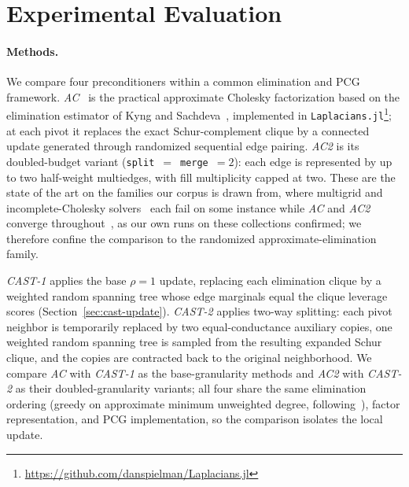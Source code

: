 \documentclass{article}
\newcommand{\CASTone}{\textit{CAST-1}\xspace}
\newcommand{\CASTtwo}{\textit{CAST-2}\xspace}
\newcommand{\AC}{\textit{AC}\xspace}
\newcommand{\ACtwo}{\textit{AC2}\xspace}
\newcommand{\1}{\mathbbm{1}}
\theoremstyle{plain}
\begin{document}

\section{Experimental Evaluation}
\label{sec:empirical_methods}


\paragraph{Methods.}
We compare four pre\-conditioners within a common elimination and PCG
framework. \AC~\cite{AC} is the practical approximate Cholesky
factorization based on the elimination estimator of Kyng and
Sachdeva~\cite{kyng2016approximate}, implemented in
\texttt{Laplacians.jl}\footnote{\url{https://github.com/danspielman/Laplacians.jl}};
at each pivot it replaces the exact Schur-complement clique by a
connected update generated through randomized sequential edge pairing.
\ACtwo{} is its doubled-budget variant (\texttt{split}~$=$~\texttt{merge}~$=2$):
each edge is represented by up to two half-weight multiedges, with fill
multiplicity capped at two. These are the state of the art on the
families our corpus is drawn from, where multigrid and
incomplete-Cholesky solvers~\cite{cmg,hypre,petsc,livne2012lean,icc}
each fail on some instance while \AC{} and \ACtwo{} converge
throughout~\cite{AC}, as our own runs on these collections confirmed; we therefore confine
the comparison to the randomized approximate-elimination family.

\CASTone{} applies the base $\rho=1$ update, replacing each elimination
clique by a weighted random spanning tree whose edge marginals equal
the clique leverage scores (Section~\ref{sec:cast-update}). \CASTtwo{}
applies two-way splitting: each pivot neighbor is temporarily replaced
by two equal-conductance auxiliary copies, one weighted random spanning
tree is sampled from the resulting expanded Schur clique, and the
copies are contracted back to the original neighborhood. We compare
\AC{} with \CASTone{} as the base-granularity methods and \ACtwo{} with
\CASTtwo{} as their doubled-granularity variants; all four share the
same elimination ordering (greedy on approximate
minimum unweighted degree, following~\cite{AC}), factor representation, and PCG
implementation, so the comparison isolates the local update.
\end{document}
